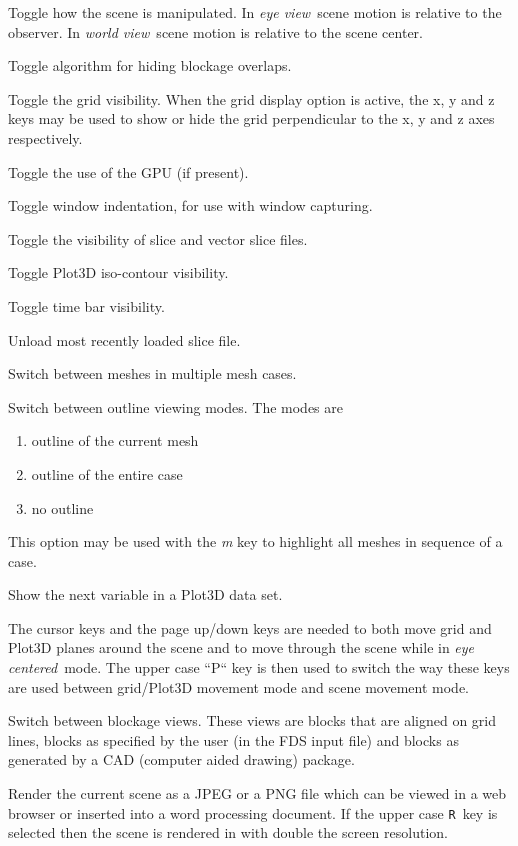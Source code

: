 \documentclass[11pt,twoside]{book}
\newcommand{\kitem}[1]{\item[{\bf {\tt #1 \  }} \hfill]}
\begin{document}
\kitem{e,E}Toggle how the scene is manipulated.  In {\em eye
view}\ scene motion is relative to the observer.  In {\em world
view}\ scene motion is relative to the scene center.

\kitem{F}Toggle algorithm for hiding blockage overlaps.

\kitem{g}Toggle the grid visibility.  When the grid display option
is active, the x, y and z keys may be used to show or hide the
grid perpendicular to the x, y and z axes respectively.

\kitem{G}Toggle the use of the GPU (if present).

 \kitem{h}Toggle window indentation, for use with window
capturing.

\kitem{H}Toggle the visibility of slice and vector slice files.

\kitem{i,I}Toggle Plot3D iso-contour visibility.

\kitem{k,K}Toggle time bar visibility.

\kitem{L}Unload most recently loaded slice file.


\kitem{m,M}Switch between meshes in multiple mesh cases.

\kitem{o,O}Switch between outline viewing modes. The modes are
\begin{enumerate}
\item outline of the current mesh
\item outline of the entire case
\item no outline
\end{enumerate}
This option may be used with the {\em m} key to highlight all meshes in sequence of a case.

\kitem{p}Show the next variable in a Plot3D data set.

\kitem{P}The cursor keys and the page up/down keys are needed to
both move grid and Plot3D planes around the scene and to move
through the scene while in {\em eye centered}\ mode.  The upper
case ``P`` key is then used to switch the way these keys are used
between grid/Plot3D movement mode and scene movement mode.


\kitem{q,Q}Switch between blockage views.  These views are blocks
that are aligned on grid lines, blocks as specified by the user
(in the FDS input file) and blocks as generated by a CAD (computer
aided drawing) package.

\kitem{r,R}Render the current scene as a JPEG or a PNG file which
can be viewed in a web browser or inserted into a word processing
document.  If the upper case {\tt R}\ key is selected then the
scene is rendered in with double the screen resolution.
\end{document}

